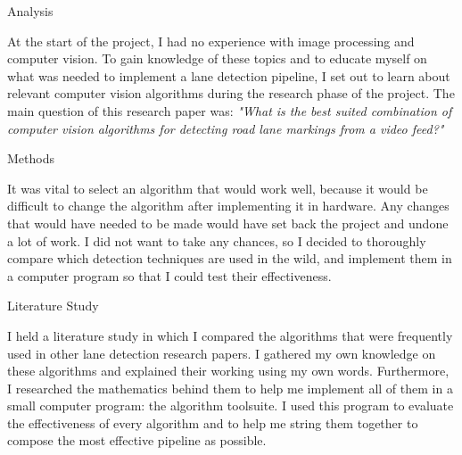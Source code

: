 \documentclass{matthijs}
\begin{document}
	\begin{hoofdstuk}{Analysis}

		\setlength\parindent{1.5em}
		\setlength{\parskip}{0.5em plus 0.2em minus 0.1em}
		\linespread{1.2}
		\vspace{-1ex}
		
		At the start of the project, I had no experience with image processing and computer vision.
		To gain knowledge of these topics and to educate myself on what was needed to implement a lane detection pipeline, I set out to learn about relevant computer vision algorithms during the research phase of the project.
		The main question of this research paper was: \textit{"What is the best suited combination of computer vision algorithms for detecting road lane markings from a video feed?"}

		\begin{paragraaf}{Methods}

			It was vital to select an algorithm that would work well, because it would be difficult to change the algorithm after implementing it in hardware.
			Any changes that would have needed to be made would have set back the project and undone a lot of work.
			I did not want to take any chances, so I decided to thoroughly compare which detection techniques are used in the wild, and implement them in a computer program so that I could test their effectiveness.

			\begin{subparagraaf}{Literature Study}
		
				\setlength\parindent{1.5em}
				\setlength{\parskip}{0.5em plus 0.2em minus 0.1em}
				\linespread{1.2}
		
				I held a literature study in which I compared the algorithms that were frequently used in other lane detection research papers.
				I gathered my own knowledge on these algorithms and explained their working using my own words.
				Furthermore, I researched the mathematics behind them to help me implement all of them in a small computer program: the algorithm toolsuite.
				I used this program to evaluate the effectiveness of every algorithm and to help me string them together to compose the most effective pipeline as possible.
			

\end{subparagraaf}
\end{paragraaf}
\end{hoofdstuk}
\end{document}
